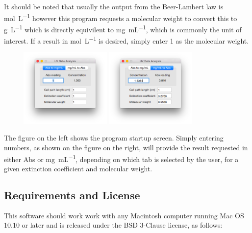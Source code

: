 \documentclass[a4paper]{article}
\begin{document}
		\noindent It should be noted that usually the output from the Beer-Lambert law is \si{\mole\per\liter} however this program requests a molecular weight to convert this to \si{\gram\per\liter} which is directly equivilent to \si{\milli\gram\per\milli\liter}, which is commonly the unit of interest. If a result in \si{\mole\per\liter} is desired, simply enter 1 as the molecular weight.

		\begin{figure}[ht!]
			\centering
			\includegraphics[width=0.4\textwidth]{Graphics/ScreenOne} \includegraphics[width=0.4\textwidth]{Graphics/ScreenTwo}
		\end{figure}

		\noindent The figure on the left shows the program startup screen. Simply entering numbers, as shown on the figure on the right, will provide the result requested in either Abs or \si{\milli\gram\per\milli\liter}, depending on which tab is selected by the user, for a given extinction coefficient and molecular weight.

		\clearpage


	\begin{centering}
 		\section*{Requirements and License}
 		\label{sec:requirements_and_license}
	\end{centering} 
		
			\noindent This software should work work with any Macintosh computer running Mac OS 10.10 or later and is released under the BSD 3-Clause license, as follows:
\end{document}
